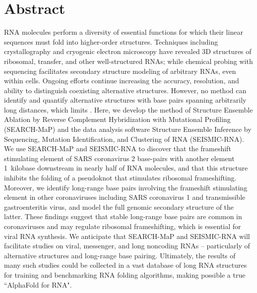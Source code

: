 \documentclass[main.tex]{subfiles}
\begin{document}
\section{Abstract}

RNA molecules perform a diversity of essential functions for which their linear sequences must fold into higher-order structures.
Techniques including crystallography and cryogenic electron microscopy have revealed 3D structures of ribosomal, transfer, and other well-structured RNAs; while chemical probing with sequencing facilitates secondary structure modeling of arbitrary RNAs, even within cells.
Ongoing efforts continue increasing the accuracy, resolution, and ability to distinguish coexisting alternative structures.
However, no method can identify and quantify alternative structures with base pairs spanning arbitrarily long distances, which limits .
Here, we develop the method of Structure Ensemble Ablation by Reverse Complement Hybridization with Mutational Profiling (SEARCH-MaP) and the data analysis software Structure Ensemble Inference by Sequencing, Mutation Identification, and Clustering of RNA (SEISMIC-RNA).
We use SEARCH-MaP and SEISMIC-RNA to discover that the frameshift stimulating element of SARS coronavirus 2 base-pairs with another element 1~kilobase downstream in nearly half of RNA molecules, and that this structure inhibits the folding of a pseudoknot that stimulates ribosomal frameshifting.
Moreover, we identify long-range base pairs involving the frameshift stimulating element in other coronaviruses including SARS coronavirus 1 and transmissible gastroenteritis virus, and model the full genomic secondary structure of the latter.
These findings suggest that stable long-range base pairs are common in coronaviruses and may regulate ribosomal frameshifting, which is essential for viral RNA synthesis.
We anticipate that SEARCH-MaP and SEISMIC-RNA will facilitate studies on viral, messenger, and long noncoding RNAs -- particularly of alternative structures and long-range base pairing.
Ultimately, the results of many such studies could be collected in a vast database of long RNA structures for training and benchmarking RNA folding algorithms, making possible a true ``AlphaFold for RNA".
\end{document}

